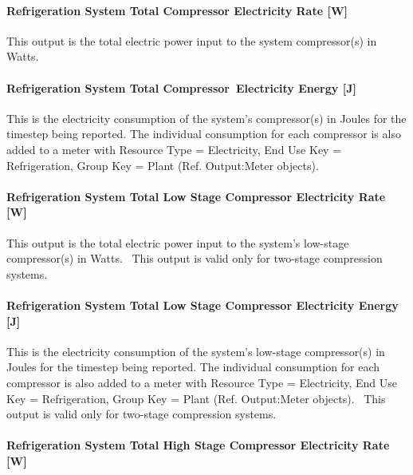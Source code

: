 \paragraph{Refrigeration System Total Compressor Electricity Rate {[}W{]}}\label{refrigeration-system-total-compressor-electric-power-w}

This output is the total electric power input to the system compressor(s) in Watts.

\paragraph{Refrigeration System Total Compressor~Electricity Energy {[}J{]}}\label{refrigeration-system-total-compressorelectric-energy-j}

This is the electricity consumption of the system's compressor(s) in Joules for the timestep being reported. The individual consumption for each compressor is also added to a meter with Resource Type = Electricity, End Use Key = Refrigeration, Group Key = Plant (Ref. Output:Meter objects).

\paragraph{Refrigeration System Total Low Stage Compressor Electricity Rate {[}W{]}}\label{refrigeration-system-total-low-stage-compressor-electric-power-w}

This output is the total electric power input to the system's low-stage compressor(s) in Watts.~ This output is valid only for two-stage compression systems.

\paragraph{Refrigeration System Total Low Stage Compressor Electricity Energy {[}J{]}}\label{refrigeration-system-total-low-stage-compressor-electric-energy-j}

This is the electricity consumption of the system's low-stage compressor(s) in Joules for the timestep being reported. The individual consumption for each compressor is also added to a meter with Resource Type = Electricity, End Use Key = Refrigeration, Group Key = Plant (Ref. Output:Meter objects).~ This output is valid only for two-stage compression systems.

\paragraph{Refrigeration System Total High Stage Compressor Electricity Rate {[}W{]}}\label{refrigeration-system-total-high-stage-compressor-electric-power-w}

